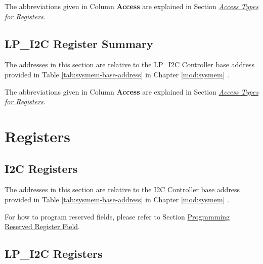 \documentclass[main\_\_EN.tex]{subfiles}
\begin{document}
The abbreviations given in Column \textbf{Access} are explained in Section \hyperref[glossary-access-types]{\textit{Access Types for Registers}}.



\subsection{LP\_I2C Register Summary}
\label{sec:lp-i2c-reg-summ}
\hypertarget{lp-i2c-reg-summ}{}

The addresses in this section are relative to the LP\_I2C Controller base address provided in Table \ref{tab:sysmem-base-address} in Chapter \ref{mod:sysmem} \textit{}.

The abbreviations given in Column \textbf{Access} are explained in Section \hyperref[glossary-access-types]{\textit{Access Types for Registers}}.





\newpage
\section{Registers}

\subsection{I2C Registers}

The addresses in this section are relative to the I2C Controller base address provided in Table \ref{tab:sysmem-base-address} in Chapter \ref{mod:sysmem} \textit{}.

For how to program reserved fields, please refer to Section \hyperref[programming-reserved-field]{Programming Reserved Register Field}.



\subsection{LP\_I2C Registers}


\end{document}
